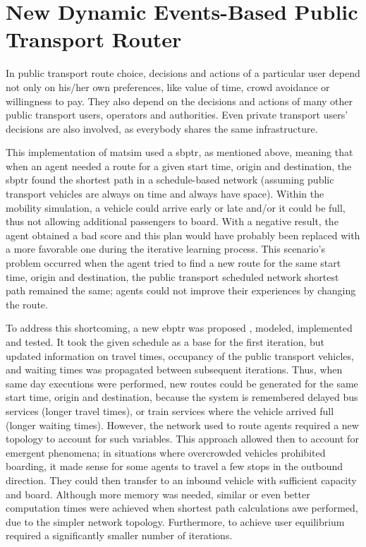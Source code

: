 \chapter{New Dynamic Events-Based Public Transport Router}
In public transport route choice, decisions and actions of a particular user depend not only on his/her own preferences, like value of time, crowd avoidance or willingness to pay. They also depend on the decisions and actions of many other public transport users, operators and authorities. Even private transport users' decisions are also involved, as everybody shares the same infrastructure.

This implementation of \gls{matsim} used a \gls{sbptr}, as mentioned above, meaning that when an agent needed a route for a given start time, origin and destination, the \gls{sbptr} found the shortest path in a schedule-based network (assuming public transport vehicles are always on time and always have space). Within the mobility simulation, a vehicle could arrive early or late and/or it could be full, thus not allowing additional passengers to board. With a negative result, the agent obtained a bad score and this plan would have probably been replaced with a more favorable one during the iterative learning process. This scenario's problem occurred when the agent tried to find a new route for the same start time, origin and destination, the public transport scheduled network shortest path remained the same; agents could not improve their experiences by changing the route.

To address this shortcoming, a new \gls{ebptr} was proposed \citep[][]{OrdonezErath_TechRep_FCL_2013}, modeled, implemented and tested. It took the given schedule as a base for the first iteration, but updated information on travel times, occupancy of the public transport vehicles, and waiting times was propagated between subsequent iterations. Thus, when same day executions were performed, new routes could be generated for the same start time, origin and destination, because the system is remembered delayed bus services (longer travel times), or train services where the vehicle arrived full (longer waiting times). However, the network used to route agents required a new topology to account for such variables. This approach allowed then to account for emergent phenomena; in situations where overcrowded vehicles prohibited boarding, it made sense for some agents to travel a few stops in the outbound direction. They could then transfer to an inbound vehicle with sufficient capacity and board. Although more memory was needed, similar or even better computation times were achieved when shortest path calculations awe performed, due to the simpler network topology. Furthermore, to achieve user equilibrium required a significantly smaller number of iterations.

